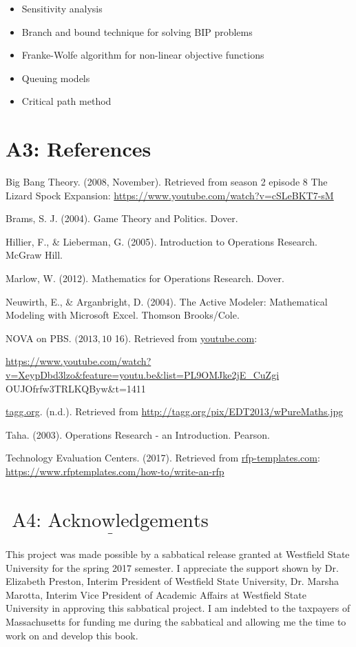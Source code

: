 \documentclass[10pt]{article}
\begin{document}
\begin{itemize}
  \item Sensitivity analysis

  \item Branch and bound technique for solving BIP problems

  \item Franke-Wolfe algorithm for non-linear objective functions

  \item Queuing models

  \item Critical path method

\end{itemize}
\section{A3: References}
Big Bang Theory. (2008, November). Retrieved from season 2 episode 8 The Lizard Spock Expansion: \href{https://www.youtube.com/watch?v=cSLeBKT7-sM}{https://www.youtube.com/watch?v=cSLeBKT7-sM}

Brams, S. J. (2004). Game Theory and Politics. Dover.

Hillier, F., \& Lieberman, G. (2005). Introduction to Operations Research. McGraw Hill.

Marlow, W. (2012). Mathematics for Operations Research. Dover.

Neuwirth, E., \& Arganbright, D. (2004). The Active Modeler: Mathematical Modeling with Microsoft Excel. Thomson Brooks/Cole.

NOVA on PBS. $(2013,10$ 16). Retrieved from \href{http://youtube.com}{youtube.com}:

\href{https://www.youtube.com/watch?v=XeypDbd3lzo&feature=youtu.be&list=PL9OMJke2jE_CuZgi}{https://www.youtube.com/watch?v=XeypDbd3lzo\&feature=youtu.be\&list=PL9OMJke2jE\_CuZgi} OUJOfrfw3TRLKQByw\&t=1411

\href{http://tagg.org}{tagg.org}. (n.d.). Retrieved from \href{http://tagg.org/pix/EDT2013/wPureMaths.jpg}{http://tagg.org/pix/EDT2013/wPureMaths.jpg}

Taha. (2003). Operations Research - an Introduction. Pearson.

Technology Evaluation Centers. (2017). Retrieved from \href{http://rfp-templates.com}{rfp-templates.com}: \href{https://www.rfptemplates.com/how-to/write-an-rfp}{https://www.rfptemplates.com/how-to/write-an-rfp}

\section{$\underline{\text { A4: Acknowledgements }}$}
This project was made possible by a sabbatical release granted at Westfield State University for the spring 2017 semester. I appreciate the support shown by Dr. Elizabeth Preston, Interim President of Westfield State University, Dr. Marsha Marotta, Interim Vice President of Academic Affairs at Westfield State University in approving this sabbatical project. I am indebted to the taxpayers of Massachusetts for funding me during the sabbatical and allowing me the time to work on and develop this book.
\end{document}
